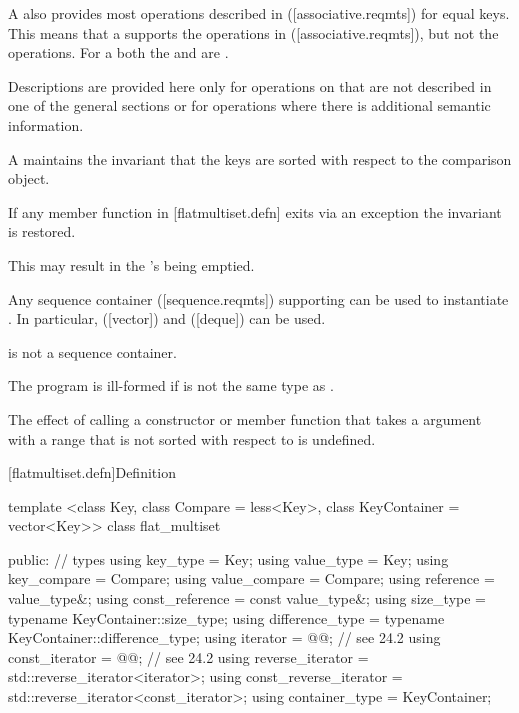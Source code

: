 \begin{addedblock}
\pnum
A  also provides most operations described in
([associative.reqmts]) for equal keys.  This means that a
 supports the  operations
in ([associative.reqmts]), but not the  operations.  For a
 both the  and  are
.

\pnum
Descriptions are provided here only for operations on 
that are not described in one of the general sections or for operations where
there is additional semantic information.

\pnum
A  maintains the invariant that the keys are sorted with
respect to the comparison object.

\pnum
If any member function in [flatmultiset.defn] exits via an exception the
invariant is restored.  \begin{note}This may result in
the 's being emptied.\end{note}

\pnum
Any sequence container ([sequence.reqmts]) supporting 
can be used to instantiate . In
particular,  ([vector]) and  ([deque]) can be
used.  \begin{note} is not a sequence container.\end{note}

\pnum
The program is ill-formed if  is not the same type
as .

\pnum
The effect of calling a constructor or member function that takes
a  argument with a range that is not sorted with
respect to  is undefined.

[flatmultiset.defn]{Definition}

\begin{codeblock}
template <class Key, class Compare = less<Key>, class KeyContainer = vector<Key>>
class flat_multiset {
  public:
    // types
    using key_type                  = Key;
    using value_type                = Key;
    using key_compare               = Compare;
    using value_compare             = Compare;
    using reference                 = value_type&;
    using const_reference           = const value_type&;
    using size_type                 = typename KeyContainer::size_type;
    using difference_type           = typename KeyContainer::difference_type;
    using iterator                  = @@; // see 24.2
    using const_iterator            = @@; // see 24.2
    using reverse_iterator          = std::reverse_iterator<iterator>;
    using const_reverse_iterator    = std::reverse_iterator<const_iterator>;
    using container_type            = KeyContainer;

}
\end{codeblock}
\end{addedblock}
